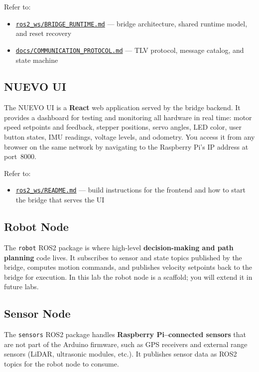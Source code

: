 \documentclass{ol-softwaremanual}
\newcommand{\doclink}[2]{\href{#1}{#2}}
\begin{document}
Refer to:
\begin{itemize}
  \item \doclink{https://github.com/pochihh/Project-NUEVO/blob/main/ros2_ws/BRIDGE_RUNTIME.md}{\texttt{ros2\_ws/BRIDGE\_RUNTIME.md}} --- bridge architecture, shared runtime model, and reset recovery
  \item \doclink{https://github.com/pochihh/Project-NUEVO/blob/main/docs/COMMUNICATION_PROTOCOL.md}{\texttt{docs/COMMUNICATION\_PROTOCOL.md}} --- TLV protocol, message catalog, and state machine
\end{itemize}

\subsection*{NUEVO UI}
The NUEVO UI is a \textbf{React} web application served by the bridge backend.
It provides a dashboard for testing and monitoring all hardware in real time:
motor speed setpoints and feedback, stepper positions, servo angles, LED color,
user button states, IMU readings, voltage levels, and odometry.
You access it from any browser on the same network by navigating to the
Raspberry Pi's IP address at port~8000.

Refer to:
\begin{itemize}
  \item \doclink{https://github.com/pochihh/Project-NUEVO/blob/main/ros2_ws/README.md}{\texttt{ros2\_ws/README.md}} --- build instructions for the frontend and how to start the bridge that serves the UI
\end{itemize}

\subsection*{Robot Node}
The \texttt{robot} ROS2 package is where high-level \textbf{decision-making and path planning}
code lives.
It subscribes to sensor and state topics published by the bridge, computes motion commands,
and publishes velocity setpoints back to the bridge for execution.
In this lab the robot node is a scaffold; you will extend it in future labs.

\subsection*{Sensor Node}
The \texttt{sensors} ROS2 package handles \textbf{Raspberry Pi--connected sensors}
that are not part of the Arduino firmware, such as GPS receivers and external range sensors
(LiDAR, ultrasonic modules, etc.).
It publishes sensor data as ROS2 topics for the robot node to consume.
\end{document}
